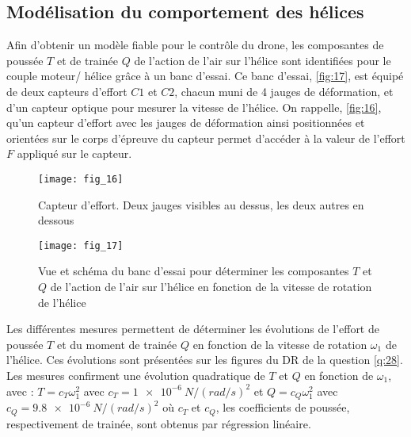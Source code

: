\ifprof
\begin{corrige}
\end{corrige}
\else
\fi

\subsection{Modélisation du comportement des hélices}
Afin d’obtenir un modèle fiable pour le contrôle du drone, les composantes de poussée
$T$ et de trainée $Q$ de l’action de l’air sur l’hélice sont identifiées pour le couple moteur/
hélice grâce à un banc d’essai. Ce banc d’essai, \autoref{fig:17}, est équipé de deux capteurs
d’effort $C1$ et $C2$, chacun muni de 4 jauges de déformation, et d’un capteur optique pour
mesurer la vitesse de l’hélice. On rappelle, \autoref{fig:16}, qu’un capteur d’effort avec les jauges
de déformation ainsi positionnées et orientées sur le corps d’épreuve du capteur permet
d’accéder à la valeur de l’effort $F$ appliqué sur le capteur.


\ifprof
\begin{corrige}
\end{corrige}
\else
\fi

\begin{figure}[H]
\centering
\texttt{[image: fig\_16]}
\caption{\label{fig:16} Capteur d’effort. Deux jauges visibles au dessus, les deux autres en dessous}
\end{figure}

\begin{figure}[H]
\centering
\texttt{[image: fig\_17]}
\caption{\label{fig:17} Vue et schéma du banc d’essai pour déterminer les composantes $T$ et $Q$ de
l’action de l’air sur l’hélice en fonction de la vitesse de rotation de l’hélice}
\end{figure}

Les différentes mesures permettent de déterminer les évolutions de l’effort de poussée $T$ et
du moment de trainée $Q$ en fonction de la vitesse de rotation $\omega_1$ de l’hélice. Ces évolutions
sont présentées sur les figures du DR de la question \ref{q:28}. Les mesures confirment une évolution
quadratique de $T$ et $Q$ en fonction de $\omega_1$, avec :
$T = c_T \omega_1^2$ avec $c_T = \SI{1e-6}{N/(rad/s)^2}$ et
$Q = c_Q \omega_1^2$ avec $c_Q = \SI{9.8e-6}{N/(rad/s)^2}$ 
où $c_T$ et $c_Q$, les coefficients de poussée, respectivement de trainée, sont obtenus par régression linéaire.

